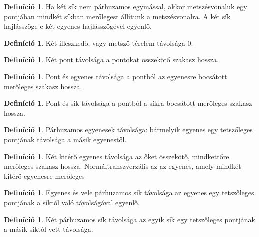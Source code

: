 \documentclass[twoside,12pt]{report}
\theoremstyle{definition}
\newtheorem{definition}[theorem]{Definíció}
\begin{document}
	\begin{definition}
		Ha két sík nem párhuzamos egymással, akkor metszésvonaluk egy pontjában mindkét síkban merőlegest állítunk a metszésvonalra. A két sík hajlásszöge e két egyenes hajlásszögével egyenlő.
	\end{definition}
	\begin{definition}
		Két illeszkedő, vagy metsző térelem távolsága 0.
	\end{definition}
	\begin{definition}
		Két pont távolsága a pontokat összekötő szakasz hossza.
	\end{definition}
	\begin{definition}
		Pont és egyenes távolsága a pontból az egyenesre bocsátott merőleges szakasz hossza.
	\end{definition}
	\begin{definition}
		Pont és sík távolsága a pontból a síkra bocsátott merőleges szakasz hossza.
	\end{definition}
	\begin{definition}
		Párhuzamos egyenesek távolsága: bármelyik egyenes egy tetszőleges pontjának távolsága
		a másik egyenestől.
	\end{definition}
	\begin{definition}
		Két kitérő egyenes távolsága az őket összekötő, mindkettőre merőleges szakasz hossza. Normáltranszverzális az az egyenes, amely mindkét kitérő egyenesre merőleges
	\end{definition}
	\begin{definition}
		Egyenes és vele párhuzamos sík távolsága az egyenes egy tetszőleges pontjának
		a síktól való távolságával egyenlő.
	\end{definition}
	\begin{definition}
		Két párhuzamos sík távolsága az egyik sík egy tetszőleges pontjának a másik síktól vett
		távolsága.
	\end{definition}
\end{document}
